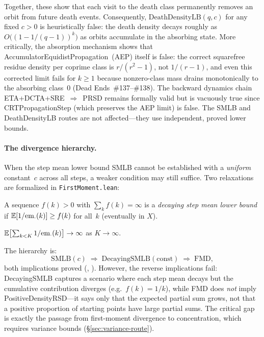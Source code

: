 \noindent Together, these show that each visit to the death class
permanently removes an orbit from future death events.
Consequently, $\mathrm{DeathDensityLB}(q, c)$ for any fixed $c > 0$
is heuristically false: the death density decays roughly as
$O\bigl((1 - 1/(q{-}1))^k\bigr)$ as orbits accumulate in the
absorbing state.  More critically, the absorption mechanism shows
that AccumulatorEquidistPropagation~(AEP) itself is false:
the correct squarefree residue density per coprime class is
$r/(r^2{-}1)$, not $1/(r{-}1)$, and even this corrected limit
fails for $k \geq 1$ because nonzero-class mass drains monotonically
to the absorbing class~$0$ (Dead Ends~\#137--\#138).
The backward dynamics chain ETA+DCTA+SRE~$\Rightarrow$~PRSD
remains formally valid but is vacuously true since
CRTPropagationStep (which preserves the AEP limit) is false.
The SMLB and DeathDensityLB routes are not affected---they
use independent, proved lower bounds.

\paragraph{The divergence hierarchy.}
\label{sec:divergence-hierarchy}
When the step mean lower bound SMLB cannot be established with a
\emph{uniform} constant~$c$ across all steps, a weaker condition
may still suffice.  Two relaxations are formalized in
\texttt{FirstMoment.lean}:

\begin{definition}
A sequence $f(k) > 0$ with $\sum_k f(k) = \infty$ is a
\emph{decaying step mean lower bound} if
$\mathbb{E}[1/\mathrm{em}_{\cdot}(k)] \geq f(k)$ for all~$k$
(eventually in $X$).
\end{definition}

\begin{definition}
$\mathbb{E}\bigl[\sum_{k<K} 1/\mathrm{em}_{\cdot}(k)\bigr] \to \infty$
as $K \to \infty$.
\end{definition}

\noindent The hierarchy is:
\[
  \mathrm{SMLB}(c)
  \;\Longrightarrow\;
  \mathrm{DecayingSMLB}(\text{const})
  \;\Longrightarrow\;
  \mathrm{FMD},
\]
both implications proved
(,
).
However, the reverse implications fail:
DecayingSMLB captures a scenario where each step mean decays but
the cumulative contribution diverges (e.g.\ $f(k) = 1/k$),
while FMD does \emph{not} imply PositiveDensityRSD---it says only
that the expected partial sum grows, not that a positive proportion
of starting points have large partial sums.  The critical gap is
exactly the passage from first-moment divergence to concentration,
which requires variance bounds
(\S\ref{sec:variance-route}).

